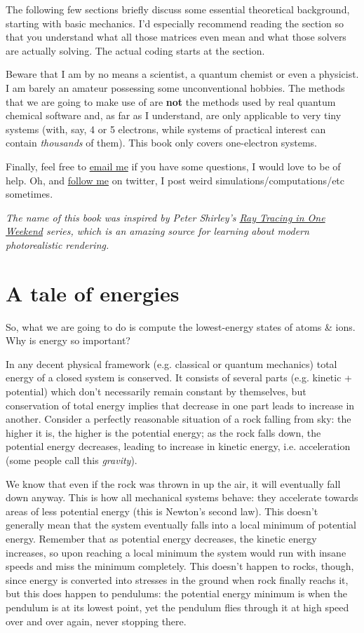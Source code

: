 \documentclass{article}
\begin{document}
The following few sections briefly discuss some essential theoretical background, starting with basic mechanics. I'd especially recommend reading the  section so that you understand what all those matrices even mean and what those solvers are actually solving. The actual coding starts at the  section.

Beware that I am by no means a scientist, a quantum chemist or even a physicist. I am barely an amateur possessing some unconventional hobbies. The methods that we are going to make use of are \textbf{not} the methods used by real quantum chemical software and, as far as I understand, are only applicable to very tiny systems (with, say, 4 or 5 electrons, while systems of practical interest can contain \textit{thousands} of them). This book only covers one-electron systems.

Finally, feel free to \href{mailto:lisyarus@gmail.com}{email me} if you have some questions, I would love to be of help. Oh, and \href{https://twitter.com/lisyarus}{follow me} on twitter, I post weird simulations/computations/etc sometimes.

\bigbreak
\textit{The name of this book was inspired by Peter Shirley's \href{https://raytracing.github.io}{Ray Tracing in One Weekend} series, which is an amazing source for learning about modern photorealistic rendering.}

\newpage

\section{A tale of energies}

So, what we are going to do is compute the lowest-energy states of atoms \& ions. Why is energy so important?

In any decent physical framework (e.g. classical or quantum mechanics) total energy of a closed system is conserved. It consists of several parts (e.g. kinetic + potential) which don't necessarily remain constant by themselves, but conservation of total energy implies that decrease in one part leads to increase in another. Consider a perfectly reasonable situation of a rock falling from sky: the higher it is, the higher is the potential energy; as the rock falls down, the potential energy decreases, leading to increase in kinetic energy, i.e. acceleration (some people call this \textit{gravity}).

We know that even if the rock was thrown in up the air, it will eventually fall down anyway. This is how all mechanical systems behave: they accelerate towards areas of less potential energy (this is Newton's second law). This doesn't generally mean that the system eventually falls into a local minimum of potential energy. Remember that as potential energy decreases, the kinetic energy increases, so upon reaching a local minimum the system would run with insane speeds and miss the minimum completely. This doesn't happen to rocks, though, since energy is converted into stresses in the ground when rock finally reachs it, but this does happen to pendulums: the potential energy minimum is when the pendulum is at its lowest point, yet the pendulum flies through it at high speed over and over again, never stopping there.
\end{document}
